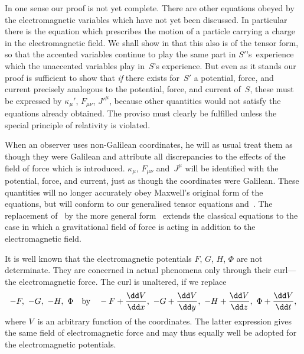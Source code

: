 \documentclass[12pt]{book}
\begin{document}
In one sense our proof is not yet complete. There are other equations
obeyed by the electromagnetic variables which have not yet been discussed.
In particular there is the equation which prescribes the motion of a particle
carrying a charge in the electromagnetic field. We shall show in  that
this also is of the tensor form, so that the accented variables continue to play
the same part in $S'$'s~experience which the unaccented variables play in~$S$'s
experience. But even as it stands our proof is sufficient to show that \emph{if} there
exists for~$S'$ a potential, force, and current precisely analogous to the potential,
%
force, and current of~$S$, these must be expressed by $\kappa_{\mu}'$, $F_{\mu\nu}$, $J'^{\mu}$, because other
quantities would not satisfy the equations already obtained. The proviso must
clearly be fulfilled unless the special principle of relativity is violated.

When an observer uses non\hyp{}Galilean coordinates, he will as usual treat
them as though they were Galilean and attribute all discrepancies to the
effects of the field of force which is introduced. $\kappa_{\mu}$, $F_{\mu\nu}$ and~$J^{\mu}$ will be identified
with the potential, force, and current, just as though the coordinates were
Galilean. These quantities will no longer accurately obey Maxwell's original
form of the equations, but will conform to our generalised tensor equations
 and~. The replacement of~ by the more general form~
extends the classical equations to the case in which a gravitational
field of force is acting in addition to the electromagnetic field.

%
%
%

%

It is well known that the electromagnetic potentials $F$, $G$, $H$, $\Phi$ are not
determinate. They are concerned in actual phenomena only through their
curl---the electromagnetic force. The curl is unaltered, if we replace
\[
-F,\ -G,\ -H,\ \Phi\quad\text{by}\quad
-F + \frac{\dd V}{\dd x},\
-G + \frac{\dd V}{\dd \smash[b]{y}},\
-H + \frac{\dd V}{\dd z},\
\Phi + \frac{\dd V}{\dd t},
\]
where $V$~is an arbitrary function of the coordinates. The latter expression
gives the same field of electromagnetic force and may thus equally well be
adopted for the electromagnetic potentials.
\end{document}
